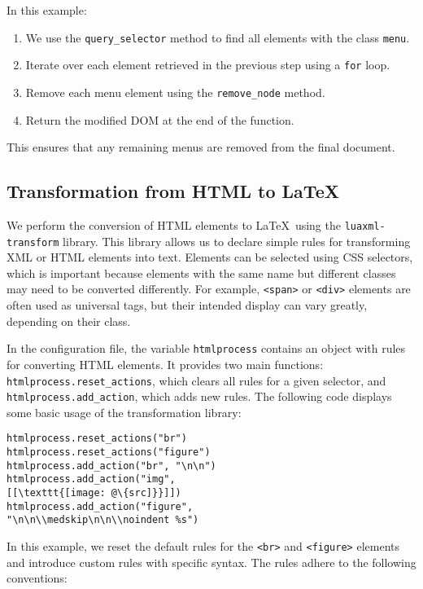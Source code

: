 \documentclass{ltugboat}
\begin{document}
In this example:

\begin{enumerate}
  \item We use the \texttt{query\_selector} method to find all elements with
    the class \texttt{menu}.
  \item Iterate over each element retrieved in the previous step
    using a \texttt{for} loop.
  \item Remove each menu element using the \texttt{remove\_node} method.
  \item Return the modified DOM at the end of the function.
\end{enumerate}

This ensures that any remaining menus are removed from the final document.

\subsection{Transformation from HTML to \LaTeX}

We perform the conversion of HTML elements to \LaTeX\ using the
\texttt{luaxml-transform} library. This library allows us to declare simple
rules for transforming XML or HTML elements into text. Elements can be selected
using CSS selectors, which is important because elements with the same name but
different classes may need to be converted differently. For example,
\verb|<span>| or \verb|<div>| elements are often used as universal tags, but
their intended display can vary greatly, depending on their class.

In the configuration file, the variable \texttt{htmlprocess} contains an object with
rules for converting HTML elements. It provides two main functions:
\texttt{htmlprocess.reset\_actions}, which clears all rules for a given selector, and
\texttt{htmlprocess.add\_action}, which adds new rules.
The following code displays some basic usage of the transformation library:

\begin{verbatim}
htmlprocess.reset_actions("br")
htmlprocess.reset_actions("figure")
htmlprocess.add_action("br", "\n\n")
htmlprocess.add_action("img", 
[[\texttt{[image: @\{src]}}]])
htmlprocess.add_action("figure", 
"\n\n\\medskip\n\n\\noindent %s")
\end{verbatim}

In this example, we reset the default rules for the \verb|<br>| and
\verb|<figure>| elements and introduce custom rules with specific syntax. The
rules adhere to the following conventions:
\end{document}
